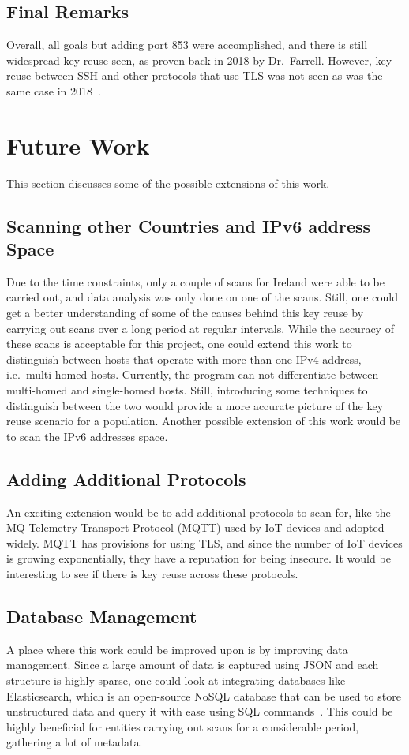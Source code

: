 \subsection{Final Remarks}
Overall, all goals but adding port 853 were accomplished, and there is still widespread key reuse seen, as proven back in 2018 by Dr.~Farrell. 
However, key reuse between SSH and other protocols that use TLS was not seen as was the same case in 2018~\cite{cryptoeprint:2018:299}. 

\newpage
\section{Future Work}
This section discusses some of the possible extensions of this work. 

\subsection{Scanning other Countries and IPv6 address Space}
Due to the time constraints, only a couple of scans for Ireland were able to be carried out, and data analysis was only done on one of the scans. Still, one could get a better understanding of some of the causes behind this key reuse by carrying out scans over a long period at regular 
intervals. While the accuracy of these scans is acceptable for this project, one could extend this work to distinguish between hosts that 
operate with more than one IPv4 address, i.e.~multi-homed hosts. Currently, the program can not differentiate between multi-homed and 
single-homed hosts. Still, introducing some techniques to distinguish between the two would provide a more accurate picture of the key 
reuse scenario for a population. Another possible extension of this work would be to scan the IPv6 addresses space.

\subsection{Adding Additional Protocols}
An exciting extension would be to add additional protocols to scan for, like the MQ Telemetry Transport Protocol (MQTT) used by IoT devices and 
adopted widely. MQTT has provisions for using TLS, and since the number of IoT devices is growing exponentially, they have a reputation for
being insecure. It would be interesting to see if there is key reuse across these protocols.  

\subsection{Database Management}
A place where this work could be improved upon is by improving data management. Since a large amount of data is captured using JSON and each 
structure is highly sparse, one could look at integrating databases like Elasticsearch, which is an open-source NoSQL database that can
be used to store unstructured data and query it with ease using SQL commands~\cite{FreeandO95:online}. This could be highly beneficial 
for entities carrying out scans for a considerable period, gathering a lot of metadata.  








